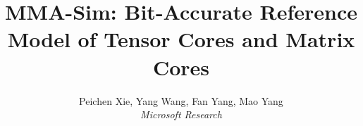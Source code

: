 \documentclass[conference]{IEEEtran}
\begin{document}
\pdfpagewidth=8.5in
\pdfpageheight=11in


\title{MMA-Sim: Bit-Accurate Reference Model of Tensor Cores and Matrix Cores}
\author{Peichen Xie, Yang Wang, Fan Yang, Mao Yang\\\textit{Microsoft Research}}


\maketitle
\thispagestyle{plain}
\pagestyle{plain}













% 


\end{document}
